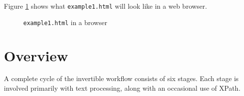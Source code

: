 \documentclass[a4paper, 12pt]{report}
\begin{document}
Figure \ref{fig:2.1} shows what \texttt{example1.html} will look like in a web browser.
\begin{figure}[h!]
\caption{\texttt{example1.html} in a browser}
\label{fig:2.1}
\end{figure}

\pagebreak
\section*{Overview}
\label{sec:overview}

A complete cycle of the invertible workflow consists of six stages. Each stage is involved primarily with text processing, along with an occasional use of XPath.
\end{document}
